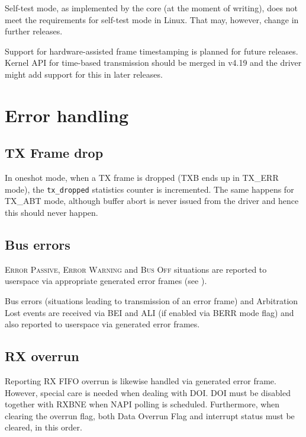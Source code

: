 Self-test mode, as implemented by the core (at the moment of writing), does not
meet the requirements for self-test mode in Linux. That may, however, change in
further releases.

Support for hardware-assisted frame timestamping is planned for future releases.
Kernel API for time-based transmission should be merged in v4.19 and the driver
might add support for this in later releases.

\section{Error handling}

\subsection{TX Frame drop}

In oneshot mode, when a TX frame is dropped (TXB ends up in TX\_ERR mode), the
\verb|tx_dropped| statistics counter is incremented. The same happens for
TX\_ABT mode, although buffer abort is never issued from the driver and hence
this should never happen.

\subsection{Bus errors}

\textsc{Error Passive}, \textsc{Error Warning} and \textsc{Bus Off} situations
are reported to userspace via appropriate generated error frames (see
\cite{linux:socketcan}).

Bus errors (situations leading to transmission of an error frame) and
Arbitration Lost events are received via BEI and ALI (if enabled via BERR mode
flag) and also reported to userspace via generated error frames.

\subsection{RX overrun}

Reporting RX FIFO overrun is likewise handled via generated error frame. However,
special care is needed when dealing with DOI. DOI must be disabled together
with RXBNE when NAPI polling is scheduled. Furthermore, when clearing the overrun flag,
both Data Overrun Flag and interrupt status must be cleared, in this order.


